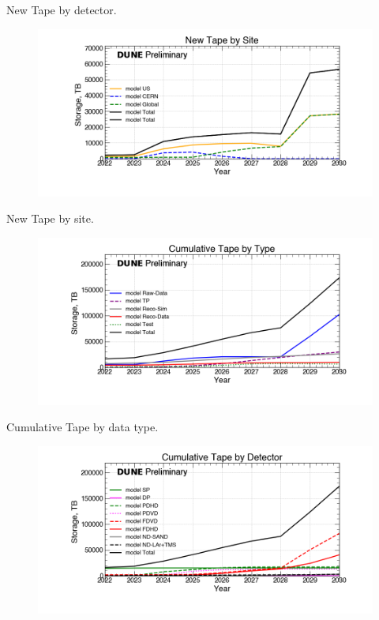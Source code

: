 \begin{table}[h]
\label{tab:TapeByYearByDetector}
\caption{New Tape by detector.}
\end{table}
\pagebreak
\begin{figure}[ht]
\centering\includegraphics[height=0.4\textwidth]{NearTerm_2024-08-14-2030_noMWC_New-Tape-by-Site-Storage.png}\end{figure}
\begin{table}[h]
\label{tab:TapeByYearBySite}
\caption{New Tape by site.}
\end{table}
\pagebreak
\begin{figure}[ht]
\centering\includegraphics[height=0.4\textwidth]{NearTerm_2024-08-14-2030_noMWC_Cumulative-Tape-by-Type-Storage.png}\end{figure}
\begin{table}[h]
\label{tab:TapeByYearByType}
\caption{Cumulative Tape by data type.}
\end{table}
\pagebreak
\begin{figure}[ht]
\centering\includegraphics[height=0.4\textwidth]{NearTerm_2024-08-14-2030_noMWC_Cumulative-Tape-by-Detector-Storage.png}\end{figure}
